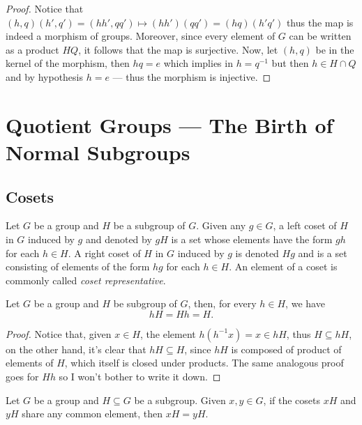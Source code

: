 \begin{proof}
    Notice that \((h, q)(h', q') = (h h', q q') \mapsto (hh')(qq') = (hq)(h'q')\)
    thus the map is indeed a morphism of groups. Moreover, since every element of
    \(G\) can be written as a product \(HQ\), it follows that the map is
    surjective. Now, let \((h, q)\) be in the kernel of the morphism, then \(hq =
    e\) which implies in \(h = q^{-1}\) but then \(h \in H \cap Q\) and by
    hypothesis \(h = e\) --- thus the morphism is injective.
\end{proof}

\section{Quotient Groups --- The Birth of Normal Subgroups}

\subsection{Cosets}

\begin{definition}[Coset]
    \label{def:coset}
    Let \(G\) be a group and \(H\) be a subgroup of \(G\). Given any \(g \in G\), a
    left coset of \(H\) in \(G\) induced by \(g\) and denoted by \(g H\) is a set
    whose elements have the form \(g h\) for each \(h \in H\). A right coset of
    \(H\) in \(G\) induced by \(g\) is denoted \(H g\) and is a set consisting of
    elements of the form \(h g\) for each \(h \in H\). An element of a coset is
    commonly called \emph{coset representative}.
\end{definition}

\begin{corollary}
    Let \(G\) be a group and \(H\) be subgroup of \(G\), then, for every \(h \in
    H\), we have
    \[
        h H = H h = H.
    \]
\end{corollary}

\begin{proof}
    Notice that, given \(x \in H\), the element \(h (h^{-1} x) = x \in h H\), thus
    \(H \subseteq h H\), on the other hand, it's clear that \(hH \subseteq H\),
    since \(hH\) is composed of product of elements of \(H\), which itself is closed
    under products. The same analogous proof goes for \(Hh\) so I won't bother to
    write it down.
\end{proof}

\begin{corollary}
    \label{cor:equal-cosets}
    Let \(G\) be a group and \(H \subseteq G\) be a subgroup. Given \(x, y \in G\),
    if the cosets \(x H\) and \(y H\) share any common element, then \(x H = y H\).
\end{corollary}

